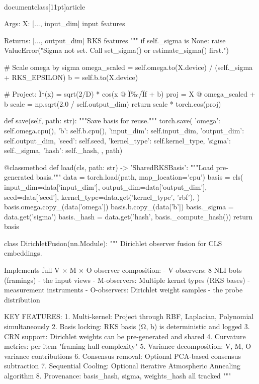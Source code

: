 \\documentclass[11pt]{article}
\begin{document}
\begin{CodeBlock}
        Args:
            X: [..., input_dim] input features
            
        Returns:
            [..., output_dim] RKS features
        """
        if self._sigma is None:
            raise ValueError("Sigma not set. Call set_sigma() or estimate_sigma() first.")
        
        # Scale omega by sigma
        omega_scaled = self.omega.to(X.device) / (self._sigma + RKS_EPSILON)
        b = self.b.to(X.device)
        
        # Project: Ï†(x) = sqrt(2/D) * cos(x @ Ï‰/Ïƒ + b)
        proj = X @ omega_scaled + b
        scale = np.sqrt(2.0 / self.output_dim)
        return scale * torch.cos(proj)
    
    def save(self, path: str):
        """Save basis for reuse."""
        torch.save({
            'omega': self.omega.cpu(),
            'b': self.b.cpu(),
            'input_dim': self.input_dim,
            'output_dim': self.output_dim,
            'seed': self.seed,
            'kernel_type': self.kernel_type,
            'sigma': self._sigma,
            'hash': self._hash,
        }, path)
    
    @classmethod
    def load(cls, path: str) -> 'SharedRKSBasis':
        """Load pre-generated basis."""
        data = torch.load(path, map_location='cpu')
        basis = cls(
            input_dim=data['input_dim'],
            output_dim=data['output_dim'],
            seed=data['seed'],
            kernel_type=data.get('kernel_type', 'rbf'),
        )
        basis.omega.copy_(data['omega'])
        basis.b.copy_(data['b'])
        basis._sigma = data.get('sigma')
        basis._hash = data.get('hash', basis._compute_hash())
        return basis


class DirichletFusion(nn.Module):
    """
    Dirichlet observer fusion for CLS embeddings.
    
    Implements full V × M × O observer composition:
    - V-observers: 8 NLI bots (framings) - the input views
    - M-observers: Multiple kernel types (RKS bases) - measurement instruments
    - O-observers: Dirichlet weight samples - the probe distribution
    
    KEY FEATURES:
    1. Multi-kernel: Project through RBF, Laplacian, Polynomial simultaneously
    2. Basis locking: RKS basis (Ω, b) is deterministic and logged
    3. CRN support: Dirichlet weights can be pre-generated and shared
    4. Curvature metrics: per-item "framing hull complexity"
    5. Variance decomposition: V, M, O variance contributions
    6. Consensus removal: Optional PCA-based consensus subtraction
    7. Sequential Cooling: Optional iterative Atmospheric Annealing algorithm
    8. Provenance: basis_hash, sigma, weights_hash all tracked
    """
    

\end{CodeBlock}
\end{document}

